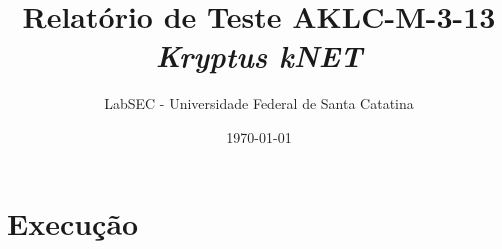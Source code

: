 \documentclass[a4paper]{report}
\title{Relatório de Teste AKLC-M-3-13 \\ \emph{Kryptus kNET} }
\author{LabSEC - Universidade Federal de Santa Catatina}
\date{\today}
\begin{document}
\maketitle

\section{Execução}
\begin{alltt}
	\small
	
\end{alltt}
\end{document}
